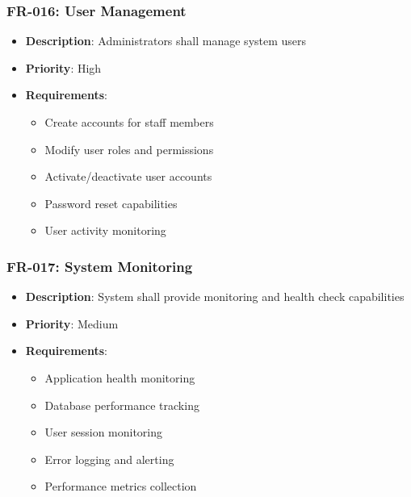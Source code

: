 \documentclass[12pt,a4paper]{article}
\begin{document}
\subsubsection{FR-016: User Management}
\begin{itemize}
    \item \textbf{Description}: Administrators shall manage system users
    \item \textbf{Priority}: High
    \item \textbf{Requirements}:
    \begin{itemize}
        \item Create accounts for staff members
        \item Modify user roles and permissions
        \item Activate/deactivate user accounts
        \item Password reset capabilities
        \item User activity monitoring
    \end{itemize}
\end{itemize}

\subsubsection{FR-017: System Monitoring}
\begin{itemize}
    \item \textbf{Description}: System shall provide monitoring and health check capabilities
    \item \textbf{Priority}: Medium
    \item \textbf{Requirements}:
    \begin{itemize}
        \item Application health monitoring
        \item Database performance tracking
        \item User session monitoring
        \item Error logging and alerting
        \item Performance metrics collection
    \end{itemize}
\end{itemize}
\end{document}
